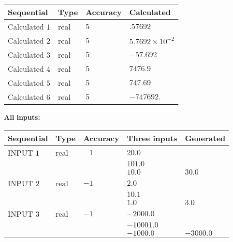 \documentclass[12pt]{article}
\begin{document}
  
\noindent\begin{tabular}{|l|l|l|l|}
\hline
 Sequential & Type & Accuracy & Calculated \\ 
\hline
 
 
  Calculated $           1$ & real & $           5 $ & 
 $ .57692 $ 
 \\  \hline  
 
 
  Calculated $           2$ & real & $           5 $ & 
 $ 5.7692 \times 10^{-2} $ 
 \\  \hline  
 
 
  Calculated $           3$ & real & $           5 $ & 
 $ -57.692 $ 
 \\  \hline  
 
 
  Calculated $           4$ & real & $           5 $ & 
 $ 7476.9 $ 
 \\  \hline  
 
 
  Calculated $           5$ & real & $           5 $ & 
 $ 747.69 $ 
 \\  \hline  
 
 
  Calculated $           6$ & real & $           5 $ & 
 $ -747692. $ 
 \\  \hline  
 \end{tabular}
   
   
   
   
\noindent\vspace{0.1in}\hspace{-0.08in} {\textbf{\Large{All inputs: }}}
   
   
  
  
\noindent\begin{tabular}{|l|l|l|l|l|}
\hline
 Sequential & Type & Accuracy & Three inputs & Generated \\ 
\hline
 
 
  INPUT $           1$ & real & $          -1 $ & $
 20.0
  $ & \\
  & & &  $
 101.0
  $ & \\
  & & &  $
 10.0
 $ & $ 30.0 $ 
 \\  \hline  
 
 
  INPUT $           2$ & real & $          -1 $ & $
 2.0
  $ & \\
  & & &  $
 10.1
  $ & \\
  & & &  $
 1.0
 $ & $ 3.0 $ 
 \\  \hline  
 
 
  INPUT $           3$ & real & $          -1 $ & $
 -2000.0
  $ & \\
  & & &  $
 -10001.0
  $ & \\
  & & &  $
 -1000.0
 $ & $ -3000.0 $ 
 \\  \hline  
 \end{tabular}
   
\end{document}
